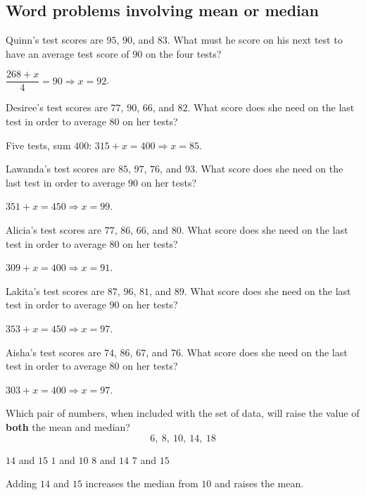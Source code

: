 \newpage
\subsection*{Word problems involving mean or median}

\question[5]
Quinn's test scores are $95$, $90$, and $83$. What must he score on his next test to have an average test score of $90$ on the four tests?
\begin{solution}
  $\dfrac{268+x}{4}=90\Rightarrow x=92$.
\end{solution}

\question[5]
Desiree's test scores are $77$, $90$, $66$, and $82$. What score does she need on the last test in order to average $80$ on her tests?
\begin{solution}
  Five tests, sum $400$: $315+x=400\Rightarrow x=85$.
\end{solution}

\question[5]
Lawanda's test scores are $85$, $97$, $76$, and $93$. What score does she need on the last test in order to average $90$ on her tests?
\begin{solution}
  $351+x=450\Rightarrow x=99$.
\end{solution}

\question[5]
Alicia's test scores are $77$, $86$, $66$, and $80$. What score does she need on the last test in order to average $80$ on her tests?
\begin{solution}
  $309+x=400\Rightarrow x=91$.
\end{solution}


\newpage



\question[5]
Lakita's test scores are $87$, $96$, $81$, and $89$. What score does she need on the last test in order to average $90$ on her tests?
\begin{solution}
  $353+x=450\Rightarrow x=97$.
\end{solution}

\question[5]
Aisha's test scores are $74$, $86$, $67$, and $76$. What score does she need on the last test in order to average $80$ on her tests?
\begin{solution}
  $303+x=400\Rightarrow x=97$.
\end{solution}

\question[5]
Which pair of numbers, when included with the set of data, will raise the value of \textbf{both} the mean and median?
\[
  6,\ 8,\ 10,\ 14,\ 18
\]
\begin{choices}
  \CorrectChoice $14$ and $15$
  \choice $1$ and $10$
  \choice $8$ and $14$
  \choice $7$ and $15$
\end{choices}
\begin{solution}
  Adding $14$ and $15$ increases the median from $10$ and raises the mean.
\end{solution}



